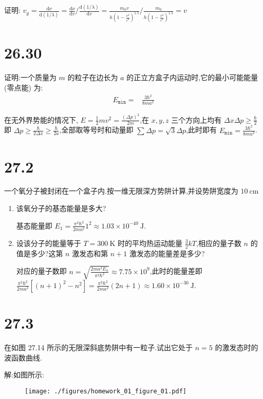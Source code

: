     证明: $v_{g}=\frac{\mathrm{d}\nu}{\mathrm{d}\left( 1 / \lambda \right) }=\frac{\mathrm{d}\nu}{\mathrm{d}v} / \frac{\mathrm{d}\left( 1 / \lambda \right) }{\mathrm{d}v}=\frac{m_{0} v}{h \left(1 - \frac{v^{2}}{c^{2}}\right)^{1.5}} /\frac{m_{0}}{h \left(1 - \frac{v^{2}}{c^2}\right)^{1.5}}=v$
    \section{26.30} 证明:一个质量为 $m$ 的粒子在边长为 $a$ 的正立方盒子内运动时,它的最小可能能量 (零点能) 为:
    \begin{align}
        E_{\texttt{min}}=&\frac{3\hbar^2}{8ma^2}\nonumber
    \end{align}
    
    在无外界势能的情况下, $E=\frac{1}{2}mv^2=\frac{\left( \Delta p \right) ^2}{2m}$,在 $x,y,z$ 三个方向上均有 $\Delta x\Delta p\ge \frac{\hbar}{2}$ 即 $\Delta p\ge \frac{\hbar}{2\Delta x}\ge\frac{\hbar}{2a}$,全部取等号时和动量即 $\sum_{}^{}\Delta p=\sqrt{3}\Delta p$,此时即有 $E_{\texttt{min}}=\frac{3\hbar^2}{8ma^2}$.
    \section{27.2} 一个氧分子被封闭在一个盒子内.按一维无限深方势阱计算,并设势阱宽度为 $10 \ \mathrm{cm}$
    \begin{enumerate}
        \item 该氧分子的基态能量是多大?

            基态能量即 $E_1=\frac{\pi^2\hbar^2}{2ma^2}1^2\approx 1.03\times 10^{-40} \ \mathrm{J}$.
        \item 设该分子的能量等于 $T=300 \ \mathrm{K}$ 时的平均热运动能量 $\frac{3}{2}kT$,相应的量子数 $n$ 的值是多少?这第 $n$ 激发态和第 $n+1$ 激发态的能量差是多少?

            对应的量子数即 $n=\sqrt{\frac{2ma^2E_{n}}{\pi^2\hbar^2}}\approx 7.75\times 10^{9}$,此时的能量差即 $\frac{\pi^2\hbar^2}{2ma^2}\left[\left( n+1 \right) ^2-n^2\right]=\frac{\pi^2\hbar^2}{2ma^2}\left( 2n+1 \right) \approx 1.60\times 10^{-30} \ \mathrm{J}$.
    \end{enumerate}
    \section{27.3} 在如图 27.14 所示的无限深斜底势阱中有一粒子.试出它处于 $n=5$ 的激发态时的波函数曲线.

    解:如图所示:
    \begin{figure}[htbp]
        \centering
        \texttt{[image: ./figures/homework\_01\_figure\_01.pdf]}
    \end{figure}
